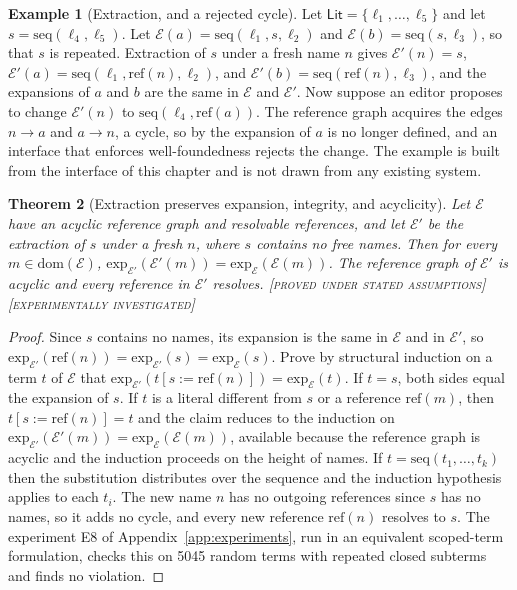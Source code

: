 \documentclass[11pt,twoside,openright]{book}
\theoremstyle{plain}
\newtheorem{theorem}{Theorem}[chapter]
\theoremstyle{definition}
\newtheorem{example}[theorem]{Example}
\theoremstyle{remark}
\newcommand{\Proved}{\textup{\textsc{[proved under stated assumptions]}}}
\newcommand{\Tested}{\textup{\textsc{[experimentally investigated]}}}
\begin{document}
\begin{example}[Extraction, and a rejected cycle]
Let $\mathsf{Lit}=\{\ell_1,\dots,\ell_5\}$ and let $s=\mathrm{seq}(\ell_4,\ell_5)$. Let $\mathcal{E}(a)=\mathrm{seq}(\ell_1,s,\ell_2)$ and $\mathcal{E}(b)=\mathrm{seq}(s,\ell_3)$, so that $s$ is repeated. Extraction of $s$ under a fresh name $n$ gives $\mathcal{E}'(n)=s$, $\mathcal{E}'(a)=\mathrm{seq}(\ell_1,\mathrm{ref}(n),\ell_2)$, and $\mathcal{E}'(b)=\mathrm{seq}(\mathrm{ref}(n),\ell_3)$, and the expansions of $a$ and $b$ are the same in $\mathcal{E}$ and $\mathcal{E}'$. Now suppose an editor proposes to change $\mathcal{E}'(n)$ to $\mathrm{seq}(\ell_4,\mathrm{ref}(a))$. The reference graph acquires the edges $n\to a$ and $a\to n$, a cycle, so by  the expansion of $a$ is no longer defined, and an interface that enforces well-foundedness rejects the change. The example is built from the interface of this chapter and is not drawn from any existing system.
\end{example}

\begin{theorem}[Extraction preserves expansion, integrity, and acyclicity]\label{thm:extraction}
Let $\mathcal{E}$ have an acyclic reference graph and resolvable references, and let $\mathcal{E}'$ be the extraction of $s$ under a fresh $n$, where $s$ contains no free names. Then for every $m\in\mathrm{dom}(\mathcal{E})$, $\mathrm{exp}_{\mathcal{E}'}(\mathcal{E}'(m))=\mathrm{exp}_{\mathcal{E}}(\mathcal{E}(m))$. The reference graph of $\mathcal{E}'$ is acyclic and every reference in $\mathcal{E}'$ resolves.
\Proved{} \Tested{}
\end{theorem}

\begin{proof}
Since $s$ contains no names, its expansion is the same in $\mathcal{E}$ and in $\mathcal{E}'$, so $\mathrm{exp}_{\mathcal{E}'}(\mathrm{ref}(n))=\mathrm{exp}_{\mathcal{E}'}(s)=\mathrm{exp}_\mathcal{E}(s)$. Prove by structural induction on a term $t$ of $\mathcal{E}$ that $\mathrm{exp}_{\mathcal{E}'}(t[s:=\mathrm{ref}(n)])=\mathrm{exp}_\mathcal{E}(t)$. If $t=s$, both sides equal the expansion of $s$. If $t$ is a literal different from $s$ or a reference $\mathrm{ref}(m)$, then $t[s:=\mathrm{ref}(n)]=t$ and the claim reduces to the induction on $\mathrm{exp}_{\mathcal{E}'}(\mathcal{E}'(m))=\mathrm{exp}_{\mathcal{E}}(\mathcal{E}(m))$, available because the reference graph is acyclic and the induction proceeds on the height of names. If $t=\mathrm{seq}(t_1,\dots,t_k)$ then the substitution distributes over the sequence and the induction hypothesis applies to each $t_i$. The new name $n$ has no outgoing references since $s$ has no names, so it adds no cycle, and every new reference $\mathrm{ref}(n)$ resolves to $s$. The experiment E8 of Appendix~\ref{app:experiments}, run in an equivalent scoped-term formulation, checks this on 5045 random terms with repeated closed subterms and finds no violation.
\end{proof}
\end{document}
